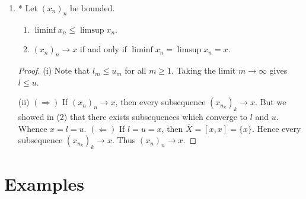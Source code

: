 \begin{enumerate}[label = (\arabic*)]
{\begin{proof}
\begin{equation*}
\begin{split}
                        N = n_1 + 1 &\implies (\exists n_2 \in \bfN)(n_2 > n_1 \hspace{4pt}\land\hspace{4pt} l_2 \leq x_{n_2} < l_2 + \frac{1}{2})\\
                        N = n_2 + 1 &\implies (\exists n_3 \in \bfN)(n_3 > n_2 \hspace{4pt}\land\hspace{4pt} l_3 \leq x_{n_3} < l_3 + \frac{1}{3})\\
                        &\vdots
                    \end{split}
                    \end{equation*}
                Inductively:
                    \begin{equation*}
                    \begin{split}
                        l_k \leq x_{n_k} < l_k + \frac{1}{k}
                        & \implies \lim_{k \rightarrow \infty} l_k \leq \lim_{k \rightarrow \infty} x_{n_k} < \lim_{k \rightarrow \infty} l_k + \frac{1}{k} \\
                        & \implies l \leq \lim_{k \rightarrow \infty} x_{n_k} < l.
                    \end{split}
                    \end{equation*}
                By the squeeze theorem, $(x_{n_k})_k \rightarrow l$. Hence $l,u \in \overline{X}$.
            \end{proof}}

        \item{\color{red}*} Let $(x_n)_n$ be bounded.
            \begin{enumerate}[label = (\roman*)]
                \item $\liminf x_n \leq \limsup x_n$.
                \item $(x_n)_n \rightarrow x$ if and only if $\liminf x_n = \limsup x_n = x$.
            \end{enumerate}
            {\color{red} \begin{proof}
                (i) Note that $l_m \leq u_m$ for all $m \geq 1$. Taking the limit $m \rightarrow \infty$ gives $l \leq u$.

                (ii) $(\Rightarrow)$ If $(x_n)_n \rightarrow x$, then every subsequence $(x_{n_k})_k \rightarrow x$. But we showed in (2) that there exists subsequences which converge to $l$ and $u$. Whence $x = l = u$. $(\Leftarrow)$ If $l = u = x$, then $\overline{X} = [x,x] = \{x\}$. Hence every subsequence $(x_{n_k})_k \rightarrow x$. Thus $(x_n)_n \rightarrow x$.
            \end{proof}}
    \end{enumerate}
\section*{Examples}
